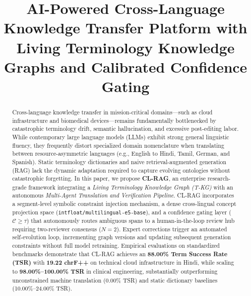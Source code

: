 \documentclass[conference]{IEEEtran}
\begin{document}
\title{AI-Powered Cross-Language Knowledge Transfer Platform with Living Terminology Knowledge Graphs and Calibrated Confidence Gating}

\author{
}

\maketitle

\begin{abstract}
Cross-language knowledge transfer in mission-critical domains---such as cloud infrastructure and biomedical devices---remains fundamentally bottlenecked by catastrophic terminology drift, semantic hallucination, and excessive post-editing labor. While contemporary large language models (LLMs) exhibit strong general linguistic fluency, they frequently distort specialized domain nomenclature when translating between resource-asymmetric languages (e.g., English to Hindi, Tamil, German, and Spanish). Static terminology dictionaries and naive retrieval-augmented generation (RAG) lack the dynamic adaptation required to capture evolving ontologies without catastrophic forgetting. In this paper, we propose \textbf{CL-RAG}, an enterprise research-grade framework integrating a \textit{Living Terminology Knowledge Graph (T-KG)} with an autonomous \textit{Multi-Agent Translation and Verification Pipeline}. CL-RAG incorporates a segment-level symbolic constraint injection mechanism, a dense cross-lingual concept projection space (\texttt{intfloat/multilingual-e5-base}), and a confidence gating layer ($\mathcal{C} \ge \tau$) that autonomously routes ambiguous spans to a human-in-the-loop review hub requiring two-reviewer consensus ($N=2$). Expert corrections trigger an automated self-evolution loop, incrementing graph versions and updating subsequent generation constraints without full model retraining. Empirical evaluations on standardized benchmarks demonstrate that CL-RAG achieves an \textbf{88.00\% Term Success Rate (TSR)} with \textbf{19.22 chrF++} on technical cloud infrastructure in Hindi, while scaling to \textbf{98.00\%–100.00\% TSR} in clinical engineering, substantially outperforming unconstrained machine translation (0.00\% TSR) and static dictionary baselines (10.00\%–24.00\% TSR).
\end{abstract}
\end{document}
